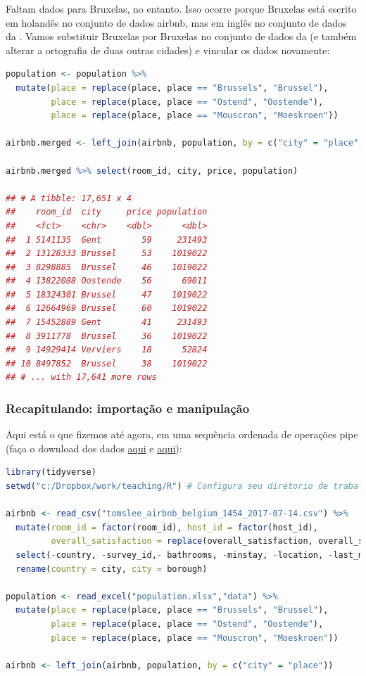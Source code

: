 \documentclass{article}
\begin{document}
Faltam dados para Bruxelas, no entanto. Isso ocorre porque Bruxelas está escrito em holandês no conjunto de dados airbnb, mas em inglês no conjunto de dados da . 
\newpage
Vamos substituir Bruxelas por Bruxelas no conjunto de dados da  (e também alterar a ortografia de duas outras cidades) e vincular os dados novamente:

\begin{lstlisting}[language=R]
population <- population %>% 
  mutate(place = replace(place, place == "Brussels", "Brussel"),
         place = replace(place, place == "Ostend", "Oostende"),
         place = replace(place, place == "Mouscron", "Moeskroen"))

airbnb.merged <- left_join(airbnb, population, by = c("city" = "place"))

airbnb.merged %>% select(room_id, city, price, population)

## # A tibble: 17,651 x 4
##    room_id  city     price population
##    <fct>    <chr>    <dbl>      <dbl>
##  1 5141135  Gent        59     231493
##  2 13128333 Brussel     53    1019022
##  3 8298885  Brussel     46    1019022
##  4 13822088 Oostende    56      69011
##  5 18324301 Brussel     47    1019022
##  6 12664969 Brussel     60    1019022
##  7 15452889 Gent        41     231493
##  8 3911778  Brussel     36    1019022
##  9 14929414 Verviers    18      52824
## 10 8497852  Brussel     38    1019022
## # ... with 17,641 more rows
\end{lstlisting}

\subsubsection{Recapitulando: importação e manipulação}

Aqui está o que fizemos até agora, em uma sequência ordenada de operações pipe (faça o download dos dados \href{http://users.telenet.be/samuelfranssens/tutorial_data/tomslee_airbnb_belgium_1454_2017-07-14.csv}{aqui} e \href{http://users.telenet.be/samuelfranssens/tutorial_data/population.xlsx}{aqui}):

\begin{lstlisting}[language=R]
library(tidyverse)
setwd("c:/Dropbox/work/teaching/R") # Configura seu diretorio de trabalho

airbnb <- read_csv("tomslee_airbnb_belgium_1454_2017-07-14.csv") %>% 
  mutate(room_id = factor(room_id), host_id = factor(host_id),
         overall_satisfaction = replace(overall_satisfaction, overall_satisfaction == 0, NA)) %>% 
  select(-country, -survey_id,- bathrooms, -minstay, -location, -last_modified) %>% 
  rename(country = city, city = borough) 

population <- read_excel("population.xlsx","data") %>% 
  mutate(place = replace(place, place == "Brussels", "Brussel"),
         place = replace(place, place == "Ostend", "Oostende"),
         place = replace(place, place == "Mouscron", "Moeskroen"))

airbnb <- left_join(airbnb, population, by = c("city" = "place"))
\end{lstlisting}
\end{document}
